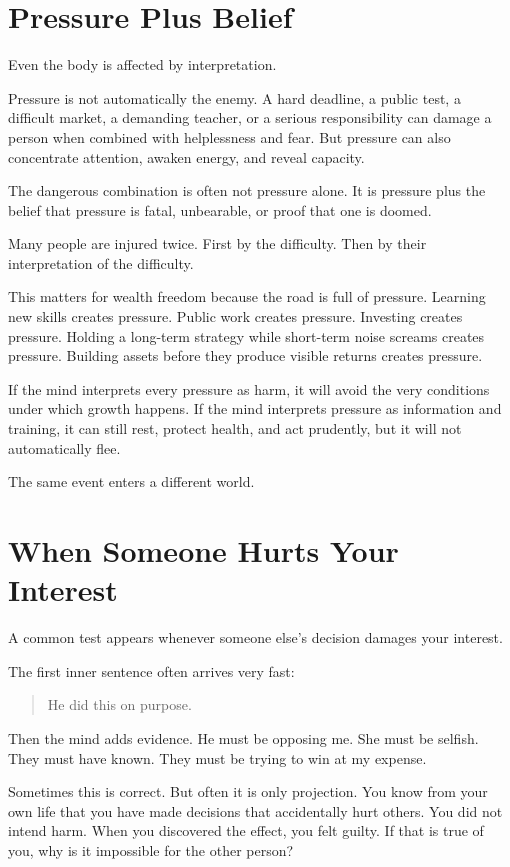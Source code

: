 \section*{Pressure Plus Belief}

Even the body is affected by interpretation.

Pressure is not automatically the enemy. A hard deadline, a public test, a difficult market, a demanding teacher, or a serious responsibility can damage a person when combined with helplessness and fear. But pressure can also concentrate attention, awaken energy, and reveal capacity.

The dangerous combination is often not pressure alone. It is pressure plus the belief that pressure is fatal, unbearable, or proof that one is doomed.

Many people are injured twice. First by the difficulty. Then by their interpretation of the difficulty.

This matters for wealth freedom because the road is full of pressure. Learning new skills creates pressure. Public work creates pressure. Investing creates pressure. Holding a long-term strategy while short-term noise screams creates pressure. Building assets before they produce visible returns creates pressure.

If the mind interprets every pressure as harm, it will avoid the very conditions under which growth happens. If the mind interprets pressure as information and training, it can still rest, protect health, and act prudently, but it will not automatically flee.

The same event enters a different world.

\section*{When Someone Hurts Your Interest}

A common test appears whenever someone else's decision damages your interest.

The first inner sentence often arrives very fast:

\begin{quote}
He did this on purpose.
\end{quote}

Then the mind adds evidence. He must be opposing me. She must be selfish. They must have known. They must be trying to win at my expense.

Sometimes this is correct. But often it is only projection. You know from your own life that you have made decisions that accidentally hurt others. You did not intend harm. When you discovered the effect, you felt guilty. If that is true of you, why is it impossible for the other person?


